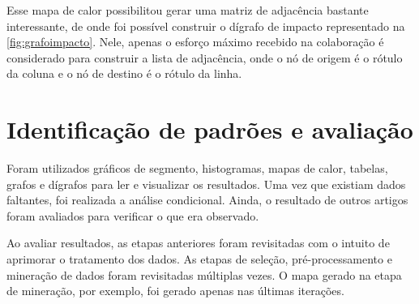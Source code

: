Esse mapa de calor possibilitou gerar uma matriz de adjacência bastante interessante, de onde foi possível construir o dígrafo de impacto representado na \autoref{fig:grafoimpacto}. Nele, apenas o esforço máximo recebido na colaboração é considerado para construir a lista de adjacência, onde o nó de origem é o rótulo da coluna e o nó de destino é o rótulo da linha.

\section{Identificação de padrões e avaliação}

Foram utilizados gráficos de segmento, histogramas, mapas de calor, tabelas, grafos e dígrafos para ler e visualizar os resultados. Uma vez que existiam dados faltantes, foi realizada a análise condicional. Ainda, o resultado de outros artigos foram avaliados para verificar o que era observado.

Ao avaliar resultados, as etapas anteriores foram revisitadas com o intuito de aprimorar o tratamento dos dados. As etapas de seleção, pré-processamento e mineração de dados foram revisitadas múltiplas vezes. O mapa gerado na etapa de mineração, por exemplo, foi gerado apenas nas últimas iterações.
